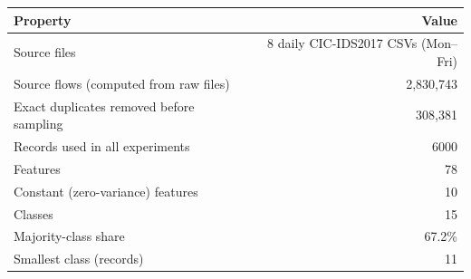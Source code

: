 \begin{tabular}{lr}
\toprule
Property & Value \\
\midrule
Source files & 8 daily CIC-IDS2017 CSVs (Mon--Fri) \\
Source flows (computed from raw files) & 2,830,743 \\
Exact duplicates removed before sampling & 308,381 \\
Records used in all experiments & 6000 \\
Features & 78 \\
Constant (zero-variance) features & 10 \\
Classes & 15 \\
Majority-class share & 67.2\% \\
Smallest class (records) & 11 \\
\bottomrule
\end{tabular}
